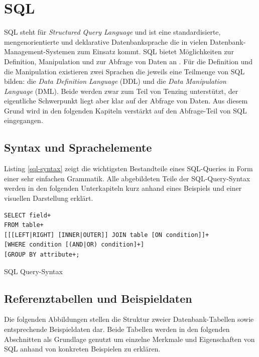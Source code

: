 \documentclass[a4paper]{article}
\begin{document}
\newpage
\section{SQL}
\label{sql}
SQL steht für \textit{Structured Query Language} und ist eine standardisierte, mengenorientierte und deklarative Datenbanksprache die in vielen Datenbank-Management-Systemen zum Einsatz kommt. SQL bietet Möglichkeiten zur Definition, Manipulation und zur Abfrage von Daten an \cite{Codd}. Für die Definition und die Manipulation existieren zwei Sprachen die jeweils eine Teilmenge von SQL bilden: die \textit{Data Definition Language} (DDL) und die \textit{Data Manipulation Language} (DML). Beide werden zwar zum Teil von Tenzing unterstützt, der eigentliche Schwerpunkt liegt aber klar auf der Abfrage von Daten. Aus diesem Grund wird in den folgenden Kapiteln verstärkt auf den Abfrage-Teil von SQL eingegangen.

\subsection{Syntax und Sprachelemente}
Listing \ref{sql-syntax} zeigt die wichtigsten Bestandteile eines SQL-Queries in Form einer sehr einfachen Grammatik. Alle abgebildeten Teile der SQL-Query-Syntax werden in den folgenden Unterkapiteln kurz anhand eines Beispiels und einer visuellen Darstellung erklärt.

\begin{listing}[H]
\begin{verbatim}
SELECT field+
FROM table+
[[[LEFT|RIGHT] [INNER|OUTER]] JOIN table [ON condition]]+
[WHERE condition [(AND|OR) condition]+]
[GROUP BY attribute+;
\end{verbatim}
\caption{SQL Query-Syntax}
\label{sql-syntax}
\end{listing}

\newpage
\subsection{Referenztabellen und Beispieldaten}
Die folgenden Abbildungen stellen die Struktur zweier Datenbank-Tabellen sowie entsprechende Beispieldaten dar. Beide Tabellen werden in den folgenden Abschnitten als Grundlage genutzt um einzelne Merkmale und Eigenschaften von SQL anhand von konkreten Beispielen zu erklären.
\end{document}
